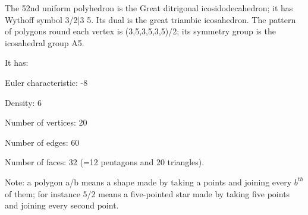 The 52nd uniform polyhedron is the Great ditrigonal icosidodecahedron; it has Wythoff symbol 3/2|3 5. Its dual is the great triambic icosahedron. The pattern of polygons round each vertex is (3,5,3,5,3,5)/2; its symmetry group is the icosahedral group A5.\par
It has:\par
Euler characteristic: -8\par
Density: 6\par
Number of vertices: 20\par
Number of edges:  60\par
Number of faces: 32 (=12 pentagons and 20 triangles).\par
Note: a polygon a/b means a shape made by taking a points and joining every $b^{th}$  of them; for instance 5/2 means a five-pointed star made by taking five points and joining every second point.